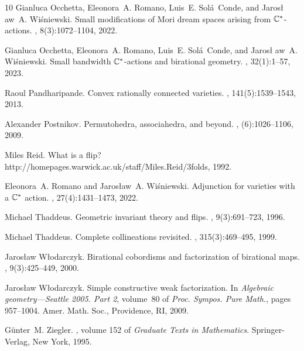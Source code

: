 \documentclass[10pt,a4paper]{article}
\numberwithin{equation}{section}
\theoremstyle{definition}
\theoremstyle{remark}
\begin{document}
\begin{thebibliography}{10}
Gianluca Occhetta, Eleonora~A. Romano, Luis~E. Sol\'{a}~Conde, and Jaros\l
  aw~A. Wi\'{s}niewski.
\newblock Small modifications of {M}ori dream spaces arising from
  {$\Bbb{C}^*$}-actions.
, 8(3):1072--1104, 2022.

Gianluca Occhetta, Eleonora~A. Romano, Luis~E. Sol\'{a}~Conde, and Jaros\l
  aw~A. Wi\'{s}niewski.
\newblock Small bandwidth {$\Bbb C^*$}-actions and birational geometry.
, 32(1):1--57, 2023.

Raoul Pandharipande.
\newblock Convex rationally connected varieties.
, 141(5):1539--1543, 2013.

Alexander Postnikov.
\newblock Permutohedra, associahedra, and beyond.
, (6):1026--1106, 2009.

Miles Reid.
\newblock What is a flip? %
  {http://homepages.warwick.ac.uk/staff/Miles.Reid/3folds}, 1992.

Eleonora~A. Romano and Jaros\l aw~A. Wi\'{s}niewski.
\newblock Adjunction for varieties with a {$\Bbb{C}^*$} action.
, 27(4):1431--1473, 2022.

Michael Thaddeus.
\newblock Geometric invariant theory and flips.
, 9(3):691--723, 1996.

Michael Thaddeus.
\newblock Complete collineations revisited.
, 315(3):469--495, 1999.

Jaros{\l}aw W{\l}odarczyk.
\newblock Birational cobordisms and factorization of birational maps.
, 9(3):425--449, 2000.

Jaros{\l}aw W{\l}odarczyk.
\newblock Simple constructive weak factorization.
\newblock In {\em Algebraic geometry---{S}eattle 2005. {P}art 2}, volume~80 of
  {\em Proc. Sympos. Pure Math.}, pages 957--1004. Amer. Math. Soc.,
  Providence, RI, 2009.

G\"{u}nter~M. Ziegler.
, volume 152 of {\em Graduate Texts in
  Mathematics}.
\newblock Springer-Verlag, New York, 1995.

\end{thebibliography}
\end{document}
